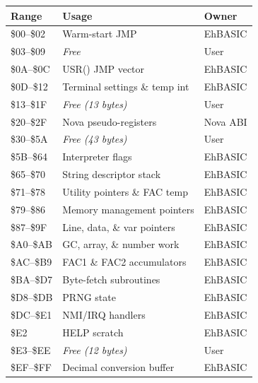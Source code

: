 \begin{center}
\small
\begin{tabular}{@{}lll@{}}
\toprule
\textbf{Range} & \textbf{Usage} & \textbf{Owner} \\
\midrule
\$00--\$02     & Warm-start JMP               & EhBASIC \\
\$03--\$09     & \textit{Free}                & User \\
\$0A--\$0C     & USR() JMP vector             & EhBASIC \\
\$0D--\$12     & Terminal settings \& temp int & EhBASIC \\
\$13--\$1F     & \textit{Free (13 bytes)}     & User \\
\$20--\$2F     & Nova pseudo-registers        & Nova ABI \\
\$30--\$5A     & \textit{Free (43 bytes)}     & User \\
\$5B--\$64     & Interpreter flags            & EhBASIC \\
\$65--\$70     & String descriptor stack       & EhBASIC \\
\$71--\$78     & Utility pointers \& FAC temp  & EhBASIC \\
\$79--\$86     & Memory management pointers   & EhBASIC \\
\$87--\$9F     & Line, data, \& var pointers  & EhBASIC \\
\$A0--\$AB     & GC, array, \& number work    & EhBASIC \\
\$AC--\$B9     & FAC1 \& FAC2 accumulators    & EhBASIC \\
\$BA--\$D7     & Byte-fetch subroutines       & EhBASIC \\
\$D8--\$DB     & PRNG state                   & EhBASIC \\
\$DC--\$E1     & NMI/IRQ handlers             & EhBASIC \\
\$E2           & HELP scratch                 & EhBASIC \\
\$E3--\$EE     & \textit{Free (12 bytes)}     & User \\
\$EF--\$FF     & Decimal conversion buffer    & EhBASIC \\
\bottomrule
\end{tabular}
\end{center}
